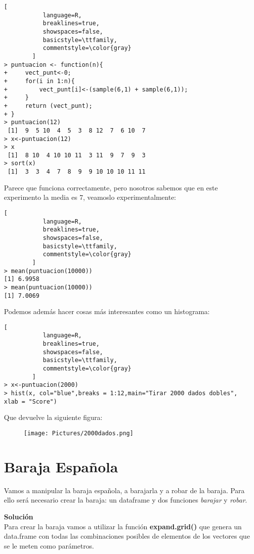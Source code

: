 \documentclass[11pt,fleqn]{book} %
\begin{document}
\begin{lstlisting}[
           language=R,
           breaklines=true,
           showspaces=false,
           basicstyle=\ttfamily,
           commentstyle=\color{gray}
        ]
> puntuacion <- function(n){
+     vect_punt<-0;
+     for(i in 1:n){
+         vect_punt[i]<-(sample(6,1) + sample(6,1));
+     }
+     return (vect_punt);
+ }
> puntuacion(12)
 [1]  9  5 10  4  5  3  8 12  7  6 10  7
> x<-puntuacion(12)
> x
 [1]  8 10  4 10 10 11  3 11  9  7  9  3
> sort(x)
 [1]  3  3  4  7  8  9  9 10 10 10 11 11
\end{lstlisting}
Parece que funciona correctamente, pero nosotros sabemos que en este experimento la media es 7, veamoslo experimentalmente:

\begin{lstlisting}[
           language=R,
           breaklines=true,
           showspaces=false,
           basicstyle=\ttfamily,
           commentstyle=\color{gray}
        ]
> mean(puntuacion(10000))
[1] 6.9958
> mean(puntuacion(10000))
[1] 7.0069
\end{lstlisting}
Podemos además hacer cosas más interesantes como un histograma:

\begin{lstlisting}[
           language=R,
           breaklines=true,
           showspaces=false,
           basicstyle=\ttfamily,
           commentstyle=\color{gray}
        ]
> x<-puntuacion(2000)
> hist(x, col="blue",breaks = 1:12,main="Tirar 2000 dados dobles", xlab = "Score")
\end{lstlisting}
Que devuelve la siguiente figura:

\begin{figure}[htbp]
\texttt{[image: Pictures/2000dados.png]}
\end{figure}


\section{Baraja Española}
\begin{exercise}
Vamos a manipular la baraja española, a barajarla y a robar de la baraja. Para ello será necesario
crear la baraja: un dataframe y dos funciones \textit{barajar} y \textit{robar}.
\end{exercise}
\textbf{Solución}\\
Para crear la baraja vamos a utilizar la función \textbf{expand.grid()} que genera un data.frame con todas las combinaciones posibles de elementos de los vectores que se le meten como parámetros.
\end{document}

